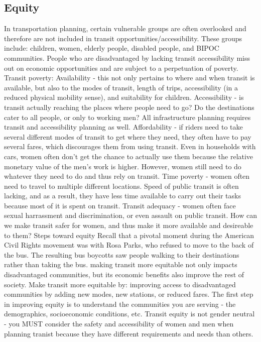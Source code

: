 \documentclass{article}
\begin{document}
    \subsection{Equity}
    \begin{outline}
        \1 In transportation planning, certain vulnerable groups are often overlooked and therefore are not included in transit opportunities/accessibility. These groups include: children, women, elderly people, disabled people, and BIPOC communities. 
        \1 People who are disadvantaged by lacking transit accessibility miss out on economic opportunities and are subject to a perpetuation of poverty. 
        \1 Transit poverty: 
            \2 Availability - this not only pertains to where and when transit is available, but also to the modes of transit, length of trips, accessibility (in a reduced physical mobility sense), and suitability for children. 
            \2 Accessibility - is transit actually reaching the places where people need to go? Do the destinations cater to all people, or only to working men? All infrastructure planning requires transit and accessibility planning as well. 
            \2 Affordability - if riders need to take several different modes of transit to get where they need, they often have to pay several fares, which discourages them from using transit. Even in households with cars, women often don't get the chance to actually use them because the relative monetary value of the men's work is higher. However, women still need to do whatever they need to do and thus rely on transit. 
            \2 Time poverty - women often need to travel to multiple different locations. Speed of public transit is often lacking, and as a result, they have less time available to carry out their tasks because most of it is spent on transit. 
            \2 Transit adequacy - women often face sexual harrassment and discrimination, or even assault on public transit. How can we make transit safer for women, and thus make it more available and desireable to them?
        \1 Steps toward equity 
            \2 Recall that a pivotal moment during the American Civil Rights movement was with Rosa Parks, who refused to move to the back of the bus. The resulting bus boycotts saw people walking to their destinations rather than taking the bus. 
            \2 making transit more equitable not only impacts disadvantaged communities, but its economic benefits also improve the rest of society. 
            \2 Make transit more equitable by: improving access to disadvantaged communities by adding new modes, new stations, or reduced fares. 
            \2 The first step in improving equity is to understand the communities you are serving - the demographics, socioeconomic conditions, etc. 
            \2 Transit equity is not gender neutral - you MUST consider the safety and accessibility of women and men when planning tranist because they have different requirements and needs than others. 

    \end{outline}
\end{document}
